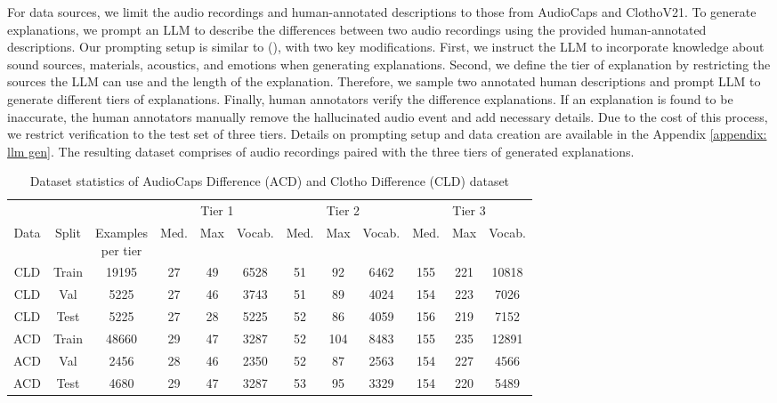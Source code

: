 For data sources, we limit the audio recordings and human-annotated descriptions to those from AudioCaps and ClothoV21. To generate explanations, we prompt an LLM to describe the differences between two audio recordings using the provided human-annotated descriptions. Our prompting setup is similar to (\cite{audioentail}), with two key modifications. First, we instruct the LLM to incorporate knowledge about sound sources, materials, acoustics, and emotions when generating explanations. Second, we define the tier of explanation by restricting the sources the LLM can use and the length of the explanation. Therefore, we sample two annotated human descriptions and prompt LLM to generate different tiers of explanations. Finally, human annotators verify the difference explanations. If an explanation is found to be inaccurate, the human annotators manually remove the hallucinated audio event and add necessary details. Due to the cost of this process, we restrict verification to the test set of three tiers. Details on prompting setup and data creation are available in the Appendix \ref{appendix: llm gen}. The resulting dataset comprises of audio recordings paired with the three tiers of generated explanations.

\begin{table}[!ht]
\scriptsize
\center
\begin{tabular}{c|c|c|ccc|ccc|ccc} \toprule
 & & & \multicolumn{3}{c|}{Tier 1} & \multicolumn{3}{c|}{Tier 2} & \multicolumn{3}{c}{Tier 3} \\
Data & Split & \makecell{Examples\\per tier} & Med. & Max & Vocab. & Med. & Max & Vocab. & Med. & Max & Vocab. \\
\midrule
CLD & Train & 19195 & 27 & 49 & 6528 & 51 & 92 & 6462 & 155 & 221 & 10818\\
CLD & Val & 5225 & 27 & 46 & 3743 & 51 & 89 & 4024 & 154 & 223 & 7026\\
CLD & Test & 5225 & 27 & 28 & 5225 & 52 & 86 & 4059 & 156 & 219 & 7152\\ \midrule
ACD & Train & 48660 & 29 & 47 & 3287 & 52 & 104 & 8483 & 155 & 235 & 12891\\
ACD & Val & 2456 & 28 & 46 & 2350  & 52 & 87 & 2563 & 154 & 227 & 4566\\ 
ACD & Test & 4680 & 29 & 47 & 3287 & 53 & 95 & 3329 & 154 & 220 & 5489 \\ \bottomrule
\end{tabular}
\caption{\small Dataset statistics of AudioCaps Difference (ACD) and Clotho Difference (CLD) dataset} \label{table: difference data stats} \vspace{-0.1in}
\end{table}

